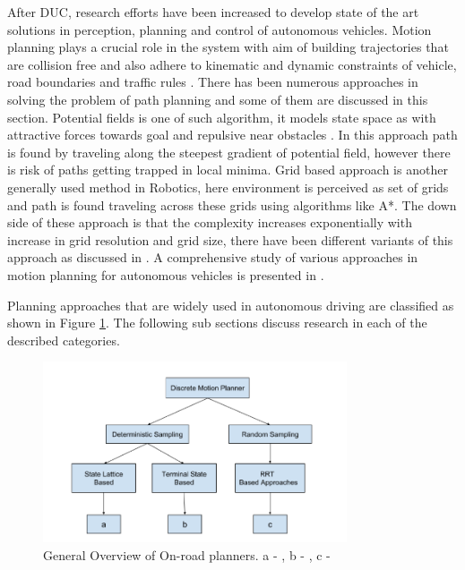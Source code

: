 After DUC, research efforts have been increased to develop state of the art solutions in perception, planning and control of autonomous vehicles. Motion planning plays a crucial role in the system with aim of building trajectories that are collision free and also adhere to kinematic and dynamic constraints of vehicle, road boundaries and traffic rules \cite{motion_planning_techniques}. There has been numerous approaches in solving the problem of path planning and some of them are discussed in this section. Potential fields is one of such algorithm, it models state space as with attractive forces towards goal and repulsive near obstacles \cite{potential_field_3} \cite{potential_field_1} \cite{potential_field_2}. In this approach path is found by traveling along the steepest gradient of potential field, however there is risk of paths getting trapped in local minima. Grid based approach is another generally used method in Robotics, here environment is perceived as set of grids and path is found traveling across these grids using algorithms like A*. The down side of these approach is that the complexity increases exponentially with increase in grid resolution and grid size, there have been different variants of this approach as discussed in \cite{A_star} \cite{D_star_1} \cite{kolski_thesis}. A comprehensive study of various approaches in motion planning for autonomous vehicles is presented in \cite{motion_planning_techniques} \cite{survey_planning_techniques}. 

 Planning approaches that are widely used in autonomous driving are classified as shown in Figure \ref{related_work_classification}. The following sub sections discuss research in each of the described categories. 

\begin{figure}[H]
	\centering
	\includegraphics[width=0.8\textwidth]{Images/related_work/planning_division.png}
	\caption{General Overview of On-road planners. a - \cite{cmu_parallel_thesis}  \cite{diss_shui_phd_thesis} \cite{traj_planner_optimization} \cite{lattice_Gu_Tiyanu} \cite{unit_A_star} , b - \cite{kolski_thesis} \cite{real_time_traj_plan_article} \cite{darpa_urban_challenge}, c -\cite{rrt_star} \cite{rrt_urban_driv} \cite{mit_rrt}
	}
	\label{related_work_classification}
\end{figure}

